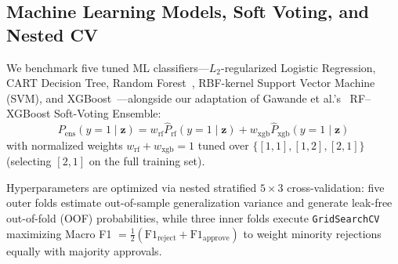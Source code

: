 \documentclass{COMPXXXX}
\begin{document}
\subsection{Machine Learning Models, Soft Voting, and Nested CV}
We benchmark five tuned ML classifiers---$L_2$-regularized Logistic Regression, CART Decision Tree, Random Forest~\cite{breiman2001}, RBF-kernel Support Vector Machine (SVM), and XGBoost~\cite{chen2016}---alongside our adaptation of Gawande et al.'s~\cite{gawande2026} RF--XGBoost Soft-Voting Ensemble:
\begin{equation}
P_{\text{ens}}(y=1 \mid \mathbf{z}) = w_{\text{rf}} \hat{P}_{\text{rf}}(y=1 \mid \mathbf{z}) + w_{\text{xgb}} \hat{P}_{\text{xgb}}(y=1 \mid \mathbf{z})
\end{equation}
with normalized weights $w_{\text{rf}} + w_{\text{xgb}} = 1$ tuned over $\{[1,1],[1,2],[2,1]\}$ (selecting $[2,1]$ on the full training set).

Hyperparameters are optimized via nested stratified $5\times 3$ cross-validation: five outer folds estimate out-of-sample generalization variance and generate leak-free out-of-fold (OOF) probabilities, while three inner folds execute \texttt{GridSearchCV} maximizing Macro F1 $= \frac{1}{2}(\text{F1}_{\text{reject}} + \text{F1}_{\text{approve}})$ to weight minority rejections equally with majority approvals.
\end{document}
